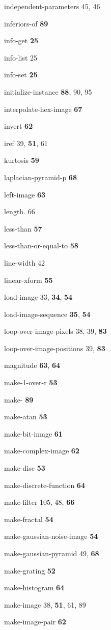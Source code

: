 \begin{theindex}
\item independent-parameters 45, 46
\item inferiors-of {\bf 89}
\item info-get {\bf 25}
\item info-list 25
\item info-set {\bf 25}
\item initialize-instance {\bf 88}, 90, 95
\item interpolate-hex-image {\bf 67}
\item invert {\bf 62}
\item iref 39, {\bf 51}, 61
\item kurtosis {\bf 59}
\item laplacian-pyramid-p {\bf 68}
\item left-image {\bf 63}
\item length. 66
\item less-than {\bf 57}
\item less-than-or-equal-to {\bf 58}
\item line-width 42
\item linear-xform {\bf 55}
\item load-image 33, {\bf 34}, {\bf 54}
\item load-image-sequence {\bf 35}, {\bf 54}
\item loop-over-image-pixels 38, 39, {\bf 83}
\item loop-over-image-positions 39, {\bf 83}
\item magnitude {\bf 63}, {\bf 64}
\item make-1-over-r {\bf 53}
\item make- {\bf 89}
\item make-atan {\bf 53}
\item make-bit-image {\bf 61}
\item make-complex-image {\bf 62}
\item make-disc {\bf 53}
\item make-discrete-function {\bf 64}
\item make-filter 105, 48, {\bf 66}
\item make-fractal {\bf 54}
\item make-gaussian-noise-image {\bf 54}
\item make-gaussian-pyramid 49, {\bf 68}
\item make-grating {\bf 52}
\item make-histogram {\bf 64}
\item make-image 38, {\bf 51}, 61, 89
\item make-image-pair {\bf 62}

\end{theindex}
